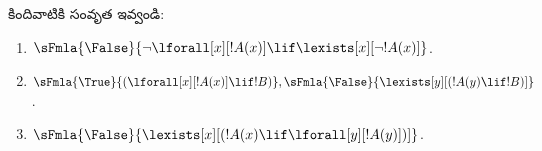 \documentclass[../../../include/open-logic-section]{subfiles}
\begin{document}
\begin{prob}
కిందివాటికి సంవృత  ఇవ్వండి:
\begin{enumerate}
\item $\sFmla{\False}{\lnot\lforall[x][!A(x)] \lif \lexists[x][\lnot!A(x)]}$.
\item $\sFmla{\True}{(\lforall[x][!A(x)] \lif !B)}, \sFmla{\False}{\lexists[y][(!A(y) \lif !B)]}$.
\item $\sFmla{\False}{\lexists[x][(!A(x) \lif \lforall[y][!A(y)])]}$.
\end{enumerate}
\end{prob}
\end{document}
